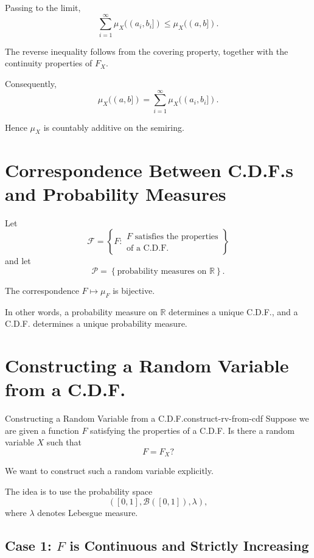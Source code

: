 Passing to the limit,
\[
\sum_{i=1}^{\infty}
\mu_X((a_i,b_i])
\leq
\mu_X((a,b]).
\]

The reverse inequality follows from the covering property, together
with the continuity properties of $F_X$.

Consequently,
\[
\mu_X((a,b])
=
\sum_{i=1}^{\infty}
\mu_X((a_i,b_i]).
\]

Hence $\mu_X$ is countably additive on the semiring.

\section{Correspondence Between C.D.F.s and Probability Measures}

Let
\[
\mathcal{F}
=
\left\{
F:
\begin{array}{c}
F\text{ satisfies the properties}\\
\text{of a C.D.F.}
\end{array}
\right\}
\]
and let
\[
\mathcal{P}
=
\left\{
\text{probability measures on }\mathbb{R}
\right\}.
\]

The correspondence
\(
F\longmapsto\mu_F
\)
is bijective.

In other words, a probability measure on $\mathbb{R}$ determines a
unique C.D.F., and a C.D.F. determines a unique probability measure.

\section{Constructing a Random Variable from a C.D.F.}

\begin{question}{Constructing a Random Variable from a C.D.F.}{construct-rv-from-cdf}
Suppose we are given a function $F$ satisfying the properties of a
C.D.F. Is there a random variable $X$ such that
\[
F=F_X?
\]
\end{question}

We want to construct such a random variable explicitly.

The idea is to use the probability space
\[
([0,1],\mathcal{B}([0,1]),\lambda),
\]
where $\lambda$ denotes Lebesgue measure.

\subsection{Case 1: $F$ is Continuous and Strictly Increasing}

